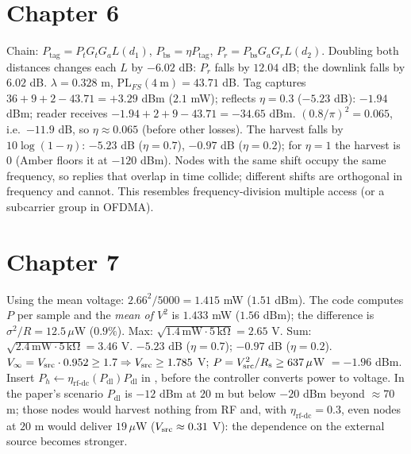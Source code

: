 \section*{Chapter 6}
 Chain: $P_{\mathrm{tag}}=P_tG_tG_aL(d_1)$, $P_{\mathrm{bs}}=\eta P_{\mathrm{tag}}$, $P_r=P_{\mathrm{bs}}G_aG_rL(d_2)$. Doubling both distances changes each $L$ by $-6.02$ dB: $P_r$ falls by $12.04$ dB; the downlink falls by $6.02$ dB.
 $\lambda=0.328$ m, $\mathrm{PL}_{FS}(4\ \mathrm m)=43.71$ dB. Tag captures $36+9+2-43.71=+3.29$ dBm ($2.1$ mW); reflects $\eta=0.3$ ($-5.23$ dB): $-1.94$ dBm; reader receives $-1.94+2+9-43.71=-34.65$ dBm.
 $(0.8/\pi)^2=0.065$, i.e.\ $-11.9$ dB, so $\eta\approx0.065$ (before other losses).
 The harvest falls by $10\log(1-\eta)$: $-5.23$ dB ($\eta=0.7$), $-0.97$ dB ($\eta=0.2$); for $\eta=1$ the harvest is $0$ (Amber floors it at $-120$ dBm).
 Nodes with the same shift occupy the same frequency, so replies that overlap in time collide; different shifts are orthogonal in frequency and cannot. This resembles frequency-division multiple access (or a subcarrier group in OFDMA).

\section*{Chapter 7}
 Using the mean voltage: $2.66^2/5000=1.415$ mW ($1.51$ dBm). The code computes $P$ per sample and the \emph{mean of $V^2$} is $1.433$ mW ($1.56$ dBm); the difference is $\sigma^2/R=12.5\,\mu$W ($0.9\%$).
 Max: $\sqrt{1.4\,\mathrm{mW}\cdot5\,\mathrm{k\Omega}}=2.65$ V. Sum: $\sqrt{2.4\,\mathrm{mW}\cdot5\,\mathrm{k\Omega}}=3.46$ V.
 $-5.23$ dB ($\eta=0.7$); $-0.97$ dB ($\eta=0.2$).
 $V_\infty=V_{\mathrm{src}}\cdot0.952\ge1.7\Rightarrow V_{\mathrm{src}}\ge1.785$ V; $P=V_{\mathrm{src}}^2/R_{\mathrm{s}}\ge637\,\mu$W $=-1.96$ dBm.
 Insert $P_h\leftarrow\eta_{\mathrm{rf\text{-}dc}}(P_{\mathrm{dl}})P_{\mathrm{dl}}$ in , before the controller converts power to voltage. In the paper's scenario $P_{\mathrm{dl}}$ is $-12$ dBm at $20$ m but below $-20$ dBm beyond $\approx70$ m; those nodes would harvest nothing from RF and, with $\eta_{\mathrm{rf\text{-}dc}}=0.3$, even nodes at $20$ m would deliver $19\,\mu$W ($V_{\mathrm{src}}\approx0.31$ V): the dependence on the external source becomes stronger.

